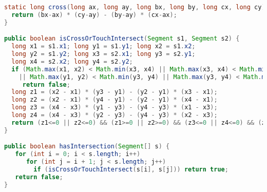 \begin{lstlisting}[language=Java]
static long cross(long ax, long ay, long bx, long by, long cx, long cy){
  return (bx-ax) * (cy-ay) - (by-ay) * (cx-ax);
}

public boolean isCrossOrTouchIntersect(Segment s1, Segment s2) {
  long x1 = s1.x1; long y1 = s1.y1; long x2 = s1.x2;
  long y2 = s1.y2; long x3 = s2.x1; long y3 = s2.y1;
  long x4 = s2.x2; long y4 = s2.y2;
  if (Math.max(x1, x2) < Math.min(x3, x4) || Math.max(x3, x4) < Math.min(x1, x2)
    || Math.max(y1, y2) < Math.min(y3, y4) || Math.max(y3, y4) < Math.min(y1, y2))
     return false;
  long z1 = (x2 - x1) * (y3 - y1) - (y2 - y1) * (x3 - x1);
  long z2 = (x2 - x1) * (y4 - y1) - (y2 - y1) * (x4 - x1);
  long z3 = (x4 - x3) * (y1 - y3) - (y4 - y3) * (x1 - x3);
  long z4 = (x4 - x3) * (y2 - y3) - (y4 - y3) * (x2 - x3);
  return (z1<=0 || z2<=0) && (z1>=0 || z2>=0) && (z3<=0 || z4<=0) && (z3>=0 || z4>=0);
}

public boolean hasIntersection(Segment[] s) {
   for (int i = 0; i < s.length; i++)
      for (int j = i + 1; j < s.length; j++)
        if (isCrossOrTouchIntersect(s[i], s[j])) return true;
   return false;
}
\end{lstlisting}

